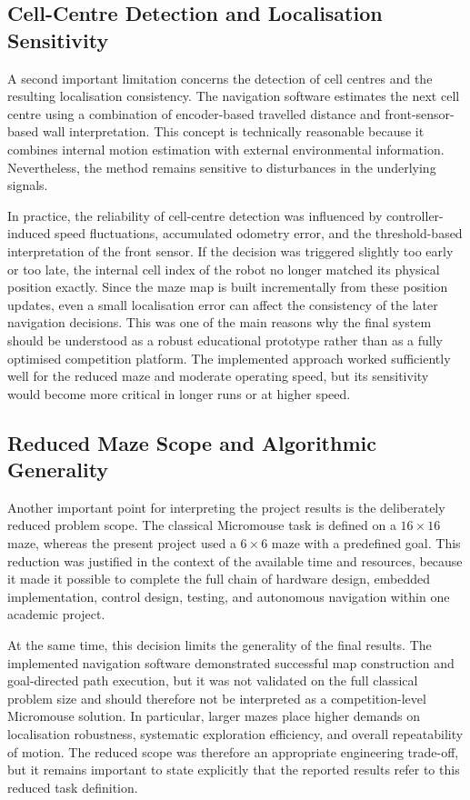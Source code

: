 \subsection{Cell-Centre Detection and Localisation Sensitivity}

A second important limitation concerns the detection of cell centres and the resulting localisation consistency. The navigation software estimates the next cell centre using a combination of encoder-based travelled distance and front-sensor-based wall interpretation. This concept is technically reasonable because it combines internal motion estimation with external environmental information. Nevertheless, the method remains sensitive to disturbances in the underlying signals.

In practice, the reliability of cell-centre detection was influenced by controller-induced speed fluctuations, accumulated odometry error, and the threshold-based interpretation of the front sensor. If the decision was triggered slightly too early or too late, the internal cell index of the robot no longer matched its physical position exactly. Since the maze map is built incrementally from these position updates, even a small localisation error can affect the consistency of the later navigation decisions. This was one of the main reasons why the final system should be understood as a robust educational prototype rather than as a fully optimised competition platform. The implemented approach worked sufficiently well for the reduced maze and moderate operating speed, but its sensitivity would become more critical in longer runs or at higher speed.

\subsection{Reduced Maze Scope and Algorithmic Generality}

Another important point for interpreting the project results is the deliberately reduced problem scope. The classical Micromouse task is defined on a $16 \times 16$ maze, whereas the present project used a $6 \times 6$ maze with a predefined goal. This reduction was justified in the context of the available time and resources, because it made it possible to complete the full chain of hardware design, embedded implementation, control design, testing, and autonomous navigation within one academic project.

At the same time, this decision limits the generality of the final results. The implemented navigation software demonstrated successful map construction and goal-directed path execution, but it was not validated on the full classical problem size and should therefore not be interpreted as a competition-level Micromouse solution. In particular, larger mazes place higher demands on localisation robustness, systematic exploration efficiency, and overall repeatability of motion. The reduced scope was therefore an appropriate engineering trade-off, but it remains important to state explicitly that the reported results refer to this reduced task definition.

